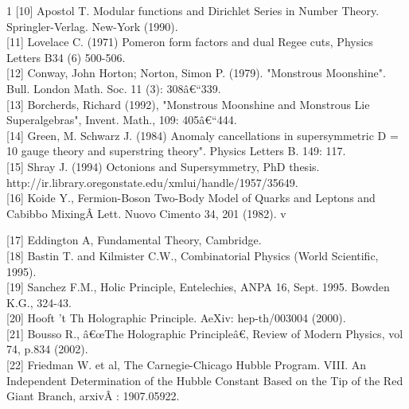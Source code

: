 \documentclass[a4paper,9pt]{article}
\begin{document}
{\begin{thebibliography}{1}
[10]   Apostol T. Modular functions and Dirichlet Series in Number Theory. Springler-Verlag. New-York (1990).\\

 [11]  Lovelace C. (1971) Pomeron form factors and dual Regee cuts, Physics Letters B34 (6) 500-506.\\

[12]  Conway, John Horton; Norton, Simon P. (1979). "Monstrous Moonshine". Bull. London Math. Soc. 11 (3): 308â€“339.\\

[13]  Borcherds, Richard (1992), "Monstrous Moonshine and Monstrous Lie Superalgebras", Invent. Math., 109: 405â€“444.\\ 

[14]  Green, M. Schwarz J. (1984)  Anomaly cancellations in supersymmetric D = 10 gauge theory and superstring theory". Physics Letters B. 149: 117.\\



 [15] Shray J. (1994) Octonions and Supersymmetry, PhD thesis.  http://ir.library.oregonstate.edu/xmlui/handle/1957/35649. \\

[16]  Koide Y., Fermion-Boson Two-Body Model of Quarks and Leptons and Cabibbo MixingÂ  Lett. Nuovo Cimento 34, 201 (1982). v 

[17]  Eddington A, Fundamental Theory, Cambridge.\\

[18] Bastin T. and Kilmister C.W., Combinatorial Physics (World Scientific, 1995).\\

[19]   Sanchez F.M., Holic Principle, Entelechies, ANPA 16, Sept. 1995. Bowden K.G., 324-43.\\

[20]   Hooft 't Th Holographic Principle. AeXiv: hep-th/003004 (2000). \\

[21] Bousso R., â€œThe Holographic Principleâ€, Review of Modern Physics, vol 74, p.834 (2002).\\

[22] Friedman W. et al, The Carnegie-Chicago Hubble Program. VIII. An Independent Determination of the Hubble Constant Based on the Tip of the Red Giant Branch, arxivÂ : 1907.05922.\\ 


\end{thebibliography}}
\end{document}

